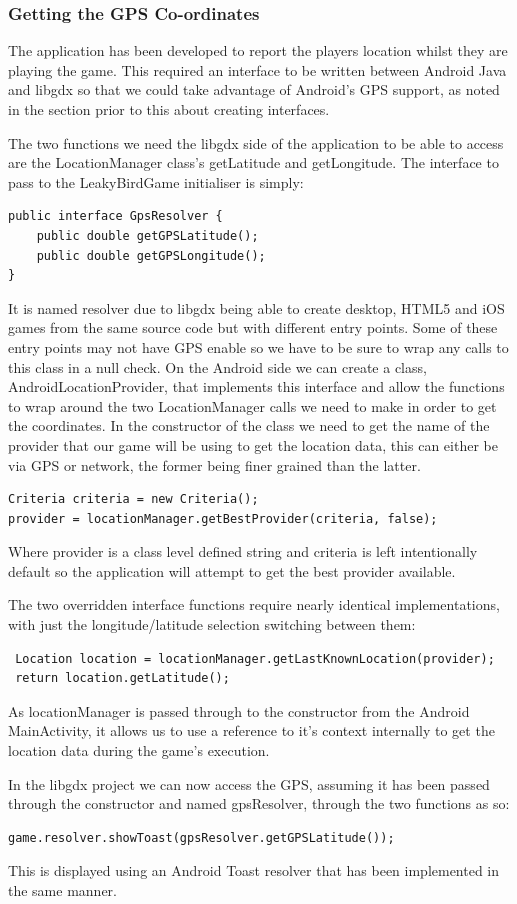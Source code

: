 \subsubsection{Getting the GPS Co-ordinates}
The application has been developed to report the players location whilst they are playing the game. This required an interface to be written between Android Java and libgdx so that we could take advantage of Android’s GPS support, as noted in the section prior to this about creating interfaces.

The two functions we need the libgdx side of the application to be able to access are the LocationManager class’s getLatitude and getLongitude. The interface to pass to the LeakyBirdGame initialiser is simply:
\begin{verbatim}
public interface GpsResolver {
    public double getGPSLatitude();
    public double getGPSLongitude();
}
\end{verbatim}
It is named resolver due to libgdx being able to create desktop, HTML5 and iOS games from the same source code but with different entry points. Some of these entry points may not have GPS enable so we have to be sure to wrap any calls to this class in a null check. On the Android side we can create a class, AndroidLocationProvider,  that implements this interface and allow the functions to wrap around the two LocationManager calls we need to make in order to get the coordinates. In the constructor of the class we need to get the name of the provider that our game will be using to get the location data, this can either be via GPS or network, the former being finer grained than the latter.
\begin{verbatim}
Criteria criteria = new Criteria();
provider = locationManager.getBestProvider(criteria, false);
\end{verbatim}
Where provider is a class level defined string and criteria is left intentionally default so the application will attempt to get the best provider available.

The two overridden interface functions require nearly identical implementations, with just the longitude/latitude selection switching between them:
\begin{verbatim}
 Location location = locationManager.getLastKnownLocation(provider);
 return location.getLatitude();
\end{verbatim}
As locationManager is passed through to the constructor from the Android MainActivity, it allows us to use a reference to it’s context internally to get the location data during the game’s execution.

In the libgdx project we can now access the GPS, assuming it has been passed through the constructor and named gpsResolver, through the two functions as so:
\begin{verbatim}
game.resolver.showToast(gpsResolver.getGPSLatitude());
\end{verbatim}
This is displayed using an Android Toast resolver that has been implemented in the same manner.


\clearpage